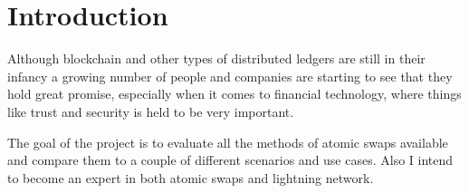 
\chapter{Introduction}
Although blockchain and other types of distributed ledgers are still in their infancy a growing number of people and companies are starting to see that they hold great promise, especially when it comes to financial technology, where things like trust and security is held to be very important. 






The goal of the project is to evaluate all the methods of atomic swaps available and compare them to a couple of different scenarios and use cases. Also I intend to become an expert in both atomic swaps and lightning network. 

